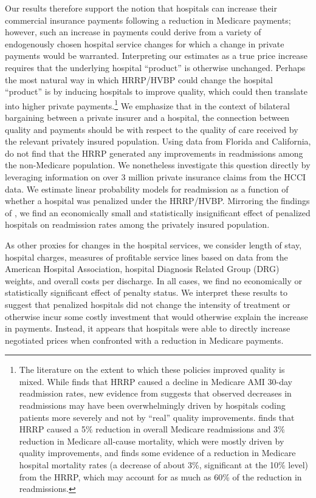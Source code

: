 \documentclass[12pt]{article}
\begin{document}
Our results therefore support the notion that hospitals can increase their commercial insurance payments following a reduction in Medicare payments; however, such an increase in payments could derive from a variety of endogenously chosen hospital service changes for which a change in private payments would be warranted. Interpreting our estimates as a true price increase requires that the underlying hospital ``product'' is otherwise unchanged. Perhaps the most natural way in which HRRP/HVBP could change the hospital ``product'' is by inducing hospitals to improve quality, which could then translate into higher private payments.\footnote{The literature on the extent to which these policies improved quality is mixed. While \citet{mellor2016} finds that HRRP caused a decline in Medicare AMI 30-day readmission rates, new evidence from \citet{Ibrahim2017} suggests that observed decreases in readmissions may have been overwhelmingly driven by hospitals coding patients more severely and not by ``real'' quality improvements.  \cite{gupta2017} finds that HRRP caused a 5$\%$ reduction in overall Medicare readmissions and 3$\%$ reduction in Medicare all-cause mortality, which were mostly driven by quality improvements, and \cite{gupta2016} finds some evidence of a reduction in Medicare hospital mortality rates (a decrease of about 3\%, significant at the 10\% level) from the HRRP, which may account for as much as 60\% of the reduction in readmissions.} We emphasize that in the context of bilateral bargaining between a private insurer and a hospital, the connection between quality and payments should be with respect to the quality of care received by the relevant privately insured population. Using data from Florida and California, \cite{demiralp2017} do not find that the HRRP generated any improvements in readmissions among the non-Medicare population.  We nonetheless investigate this question directly by leveraging information on over 3 million private insurance claims from the HCCI data. We estimate linear probability models for readmission as a function of whether a hospital was penalized under the HRRP/HVBP. Mirroring the findings of \cite{demiralp2017}, we find an economically small and statistically insignificant effect of penalized hospitals on readmission rates among the privately insured population.

As other proxies for changes in the hospital services, we consider length of stay, hospital charges, measures of profitable service lines based on data from the American Hospital Association, hospital Diagnosis Related Group (DRG) weights, and overall costs per discharge. In all cases, we find no economically or statistically significant effect of penalty status. We interpret these results to suggest that penalized hospitals did not change the intensity of treatment or otherwise incur some costly investment that would otherwise explain the increase in payments. Instead, it appears that hospitals were able to directly increase negotiated prices when confronted with a reduction in Medicare payments.
\end{document}
